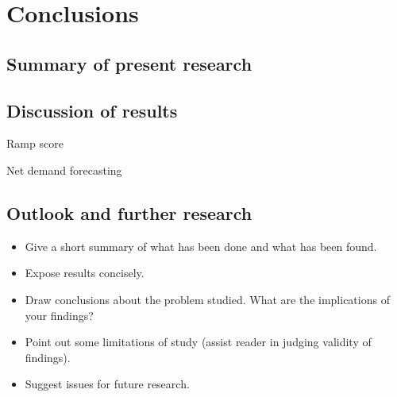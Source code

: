 
\section{Conclusions}\label{Sec:Conc}




\subsection{Summary of present research}\label{Sec:Conclusion;Subsec:Summary}




\subsection{Discussion of results}\label{Sec:Conclusion;Subsec:Discussion}

Ramp score

Net demand forecasting \citep{Meer:2018}



\subsection{Outlook and further research}\label{Sec:Conclusion;Subsec:Outlook}




\begin{itemize}

    \item Give a short summary of what has been done and what has been
    found.

    \item Expose results concisely.

    \item Draw conclusions about the problem studied. What are the
    implications of your findings?

    \item Point out some limitations of study (assist reader in judging validity
    of findings).

    \item Suggest issues for future research.

\end{itemize}
